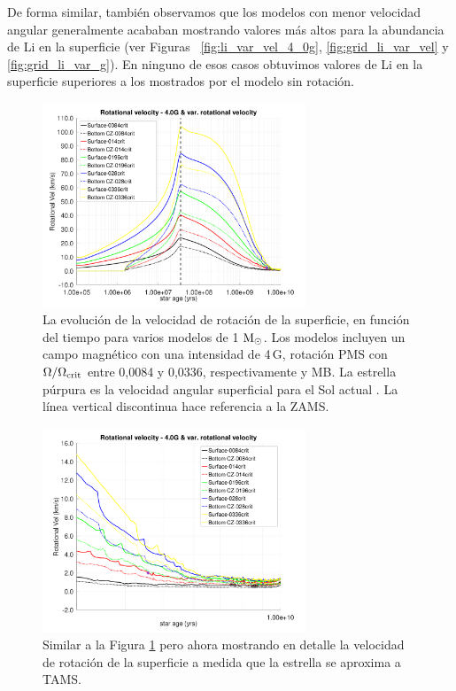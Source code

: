 De forma similar, también observamos que los modelos con menor velocidad angular generalmente acababan mostrando valores más altos para la abundancia de Li en la superficie (ver Figuras~ \ref{fig:li_var_vel_4_0g}, \ref{fig:grid_li_var_vel} y \ref{fig:grid_li_var_g}). En ninguno de esos casos obtuvimos valores de Li en la superficie superiores a los mostrados por el modelo sin rotación.\par


\begin{figure}
    \centering
    \includegraphics[width=0.7\textwidth]{img/paper1/rot_vel_var_vel_4_0g.pdf}
	\caption{La evolución de la velocidad de rotación de la superficie, en función del tiempo para varios modelos de 1 $\mathrm{M}_\odot$. Los modelos incluyen un campo magnético con una intensidad de 4\,G, rotación PMS con $\Omega / \Omega_{\mathrm{crit}}$ entre 0,0084 y 0,0336, respectivamente y MB. La estrella púrpura es la velocidad angular superficial para el Sol actual \cite{Gill2012}. La línea vertical discontinua hace referencia a la ZAMS.}
	\label{fig:rot_vel_4g}
\end{figure}

\begin{figure}
    \centering
    \includegraphics[width=0.7\textwidth]{img/paper1/rot_vel_var_vel_4_0g_z1.pdf}
	\caption{Similar a la Figura \ref{fig:rot_vel_4g} pero ahora mostrando en detalle la velocidad de rotación de la superficie a medida que la estrella se aproxima a TAMS.}
	\label{fig:rot_vel_4g_z1}
\end{figure}

